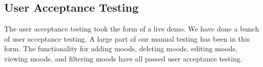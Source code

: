\subsection{User Acceptance Testing}

The user acceptance testing took the form of a live demo.
We have done a bunch of user acceptance testing. A large part of our manual
testing has been in this form. The functionality for adding moods, deleting
moods, editing moods, viewing moods, and filtering moods have all passed user
acceptance testing.



